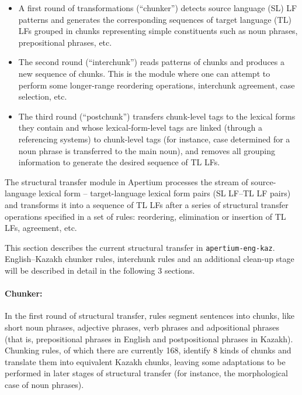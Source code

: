 \documentclass[11pt]{article}
\begin{document}
\begin{itemize}
\item A first round of transformations (``chunker'') detects source language (SL) LF patterns and generates the 
  corresponding sequences of target language (TL) LFs grouped in chunks representing simple constituents such as noun phrases, prepositional phrases, etc. 
\item The second round (``interchunk'') reads patterns of chunks and produces a new sequence of chunks. This is the 
  module where one can attempt to perform some longer-range reordering operations, interchunk agreement, case selection, etc. 
\item The third round (``postchunk'') transfers chunk-level tags to the lexical forms they contain and whose lexical-form-level 
  tags are linked (through a referencing systems) to chunk-level tags (for instance, case determined for a noun phrase is 
  transferred to the main noun), and removes all grouping information to generate the desired sequence of TL LFs.
\end{itemize}

The structural transfer module in Apertium processes the stream of source-language lexical form -- target-language lexical 
form pairs (SL LF–TL LF pairs) and transforms it into a  sequence of TL LFs after a series of structural transfer 
operations specified in a set of rules: reordering, elimination or insertion of TL LFs, agreement, etc. 

This section describes the current structural transfer in \texttt{apertium-eng-kaz}.  English--Kazakh 
chunker rules, interchunk rules and an additional clean-up stage will be described in detail in the following 3 sections. 

\paragraph{Chunker:}
In the first round of structural transfer, rules segment sentences into chunks, like short noun 
phrases, adjective phrases, verb phrases and adpositional phrases (that is, prepositional phrases in English and 
postpositional phrases in Kazakh).
Chunking rules, of which there are currently 168, identify 8 kinds of chunks and translate them into equivalent Kazakh chunks, leaving some adaptations to be performed in later stages of structural transfer (for instance, the 
morphological case of noun phrases). 

\end{document}
